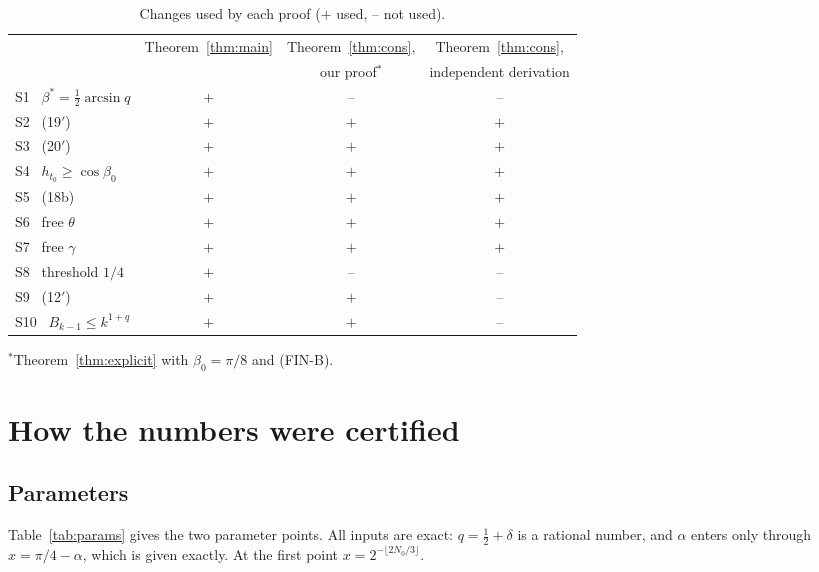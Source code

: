 \documentclass[11pt]{amsart}
\theoremstyle{remark}
\theoremstyle{plain}
\begin{document}
\begin{table}[ht]
\centering
\caption{Changes used by each proof ($+$ used, -- not used).}\label{tab:uses}
\begin{tabular}{lccc}
\toprule
& Theorem~\ref{thm:main} & Theorem~\ref{thm:cons}, & Theorem~\ref{thm:cons},\\
& & our proof$^{*}$ & independent derivation\\
\midrule
S1 \ $\beta^*=\frac12\arcsin q$ & $+$ & -- & -- \\
S2 \ (19$'$) & $+$ & $+$ & $+$ \\
S3 \ (20$'$) & $+$ & $+$ & $+$ \\
S4 \ $h_{t_0}\ge\cos\beta_0$ & $+$ & $+$ & $+$ \\
S5 \ (18b) & $+$ & $+$ & $+$ \\
S6 \ free $\theta$ & $+$ & $+$ & $+$ \\
S7 \ free $\gamma$ & $+$ & $+$ & $+$ \\
S8 \ threshold $1/4$ & $+$ & -- & -- \\
S9 \ (12$'$) & $+$ & $+$ & -- \\
S10 \ $B_{k-1}\le k^{1+q}$ & $+$ & $+$ & -- \\
\bottomrule
\end{tabular}

\smallskip
{\footnotesize $^{*}$Theorem~\ref{thm:explicit} with $\beta_0=\pi/8$ and (FIN-B).}
\end{table}

\section{How the numbers were certified}\label{sec:numerics}

\subsection*{Parameters}
Table~\ref{tab:params} gives the two parameter points. All inputs are exact: $q=\frac12+\delta$ is a rational number, and $\alpha$ enters only through $x=\pi/4-\alpha$, which is given exactly. At the first point $x=2^{-\lfloor 2N_0/3\rfloor}$.
\end{document}
